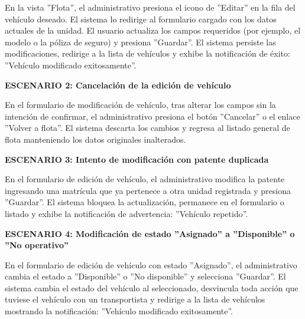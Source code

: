 \documentclass[a4paper,9pt]{article}
\begin{document}
\begin{tcolorbox}[hucard, title={\textbf{HU-45: MODIFICAR VEHÍCULO} \hfill \scriptsize \colorbox{bluestatus}{\textbf{\ New\ }} \quad \colorbox{white}{\textcolor{primarydark}{\textbf{\ 2 pts\ }}}}]
{En la vista ''Flota'', el administrativo presiona el icono de ''Editar'' en la fila del vehículo deseado. El sistema lo redirige al formulario cargado con los datos actuales de la unidad. El usuario actualiza los campos requeridos (por ejemplo, el modelo o la póliza de seguro) y presiona ''Guardar''. El sistema persiste las modificaciones, redirige a la lista de vehículos y exhibe la notificación de éxito: ''Vehículo modificado exitosamente''.\par\vspace{2.5pt}
\noindent\textbf{\textcolor{secondarydark}{ESCENARIO 2:  Cancelación de la edición de vehículo}}\par\vspace{1pt}
En el formulario de modificación de vehículo, tras alterar los campos sin la intención de confirmar, el administrativo presiona el botón ''Cancelar'' o el enlace ''Volver a flota''. El sistema descarta los cambios y regresa al listado general de flota manteniendo los datos originales inalterados.\par\vspace{2.5pt}
\noindent\textbf{\textcolor{secondarydark}{ESCENARIO 3:  Intento de modificación con patente duplicada}}\par\vspace{1pt}
En el formulario de edición de vehículo, el administrativo modifica la patente ingresando una matrícula que ya pertenece a otra unidad registrada y presiona ''Guardar''. El sistema bloquea la actualización, permanece en el formulario o listado y exhibe la notificación de advertencia: ''Vehículo repetido''.\par\vspace{2.5pt}
\noindent\textbf{\textcolor{secondarydark}{ESCENARIO 4:  Modificación de estado ''Asignado'' a ''Disponible'' o ''No operativo''}}\par\vspace{1pt}
En el formulario de edición de vehículo con estado ''Asignado'', el administrativo cambia el estado a ''Disponible'' o ''No disponible'' y selecciona ''Guardar''. El sistema cambia el estado del vehículo al seleccionado, desvincula toda acción que tuviese el vehículo con un transportista y redirige a la lista de vehículos mostrando la notificación: ''Vehículo modificado exitosamente''.\par\vspace{2.5pt}
}\par
\end{tcolorbox}
\end{document}
